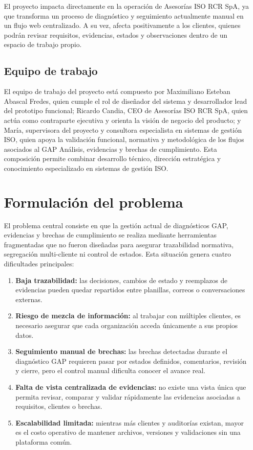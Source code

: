 \documentclass[final]{udpthesis}
\begin{document}
El proyecto impacta directamente en la operación de Asesorías ISO RCR SpA, ya que transforma un proceso de diagnóstico y seguimiento actualmente manual en un flujo web centralizado. A su vez, afecta positivamente a los clientes, quienes podrán revisar requisitos, evidencias, estados y observaciones dentro de un espacio de trabajo propio.

\section{Equipo de trabajo}

El equipo de trabajo del proyecto está compuesto por Maximiliano Esteban Abascal Fredes, quien cumple el rol de diseñador del sistema y desarrollador lead del prototipo funcional; Ricardo Candia, CEO de Asesorías ISO RCR SpA, quien actúa como contraparte ejecutiva y orienta la visión de negocio del producto; y María, supervisora del proyecto y consultora especialista en sistemas de gestión ISO, quien apoya la validación funcional, normativa y metodológica de los flujos asociados al GAP Análisis, evidencias y brechas de cumplimiento. Esta composición permite combinar desarrollo técnico, dirección estratégica y conocimiento especializado en sistemas de gestión ISO.

\chapter{Formulación del problema}

El problema central consiste en que la gestión actual de diagnósticos GAP, evidencias y brechas de cumplimiento se realiza mediante herramientas fragmentadas que no fueron diseñadas para asegurar trazabilidad normativa, segregación multi-cliente ni control de estados. Esta situación genera cuatro dificultades principales:

\begin{enumerate}
    \item \textbf{Baja trazabilidad:} las decisiones, cambios de estado y reemplazos de evidencias pueden quedar repartidos entre planillas, correos o conversaciones externas.
    \item \textbf{Riesgo de mezcla de información:} al trabajar con múltiples clientes, es necesario asegurar que cada organización acceda únicamente a sus propios datos.
    \item \textbf{Seguimiento manual de brechas:} las brechas detectadas durante el diagnóstico GAP requieren pasar por estados definidos, comentarios, revisión y cierre, pero el control manual dificulta conocer el avance real.
    \item \textbf{Falta de vista centralizada de evidencias:} no existe una vista única que permita revisar, comparar y validar rápidamente las evidencias asociadas a requisitos, clientes o brechas.
    \item \textbf{Escalabilidad limitada:} mientras más clientes y auditorías existan, mayor es el costo operativo de mantener archivos, versiones y validaciones sin una plataforma común.
\end{enumerate}
\end{document}
